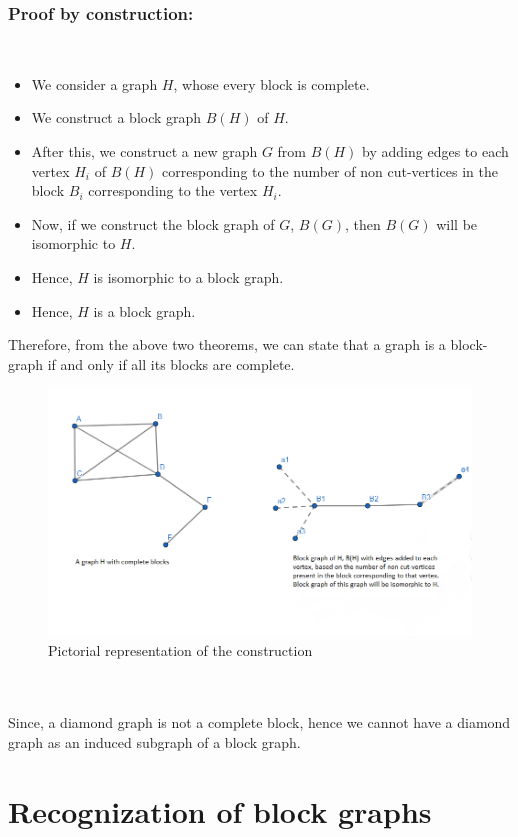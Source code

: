 \documentclass{memoir}
\begin{document}
\subsubsection{Proof by construction:}\\
\begin{itemize}
    \item We consider a graph $H$, whose every block is complete.
    \item We construct a block graph $B(H)$ of $H$.
    \item After this, we construct a new graph $G$ from $B(H)$ by adding edges to each vertex $H_i$ of $B(H)$ corresponding to the number of non cut-vertices in the block $B_i$ corresponding to the vertex $H_i$.
    \item Now, if we construct the block graph of $G$, $B(G)$, then $B(G)$ will be isomorphic to $H$.
    \item Hence, $H$ is isomorphic to a block graph.
    \item Hence, $H$ is a block graph.
 \end{itemize}
 Therefore, from the above two theorems, we can state that a graph is a block- graph if and only if all its blocks are complete. \begin{figure}[htp]
    \centering
    \includegraphics[width=15cm,scale=1.5]{theorem2.png}
    \caption{Pictorial representation of the construction}
    \label{fig:1}
\end{figure}
\\
\\
Since, a diamond graph is not a complete block, hence we cannot have a diamond graph as an induced subgraph of a block graph.
\section*{Recognization of block graphs}
\end{document}
